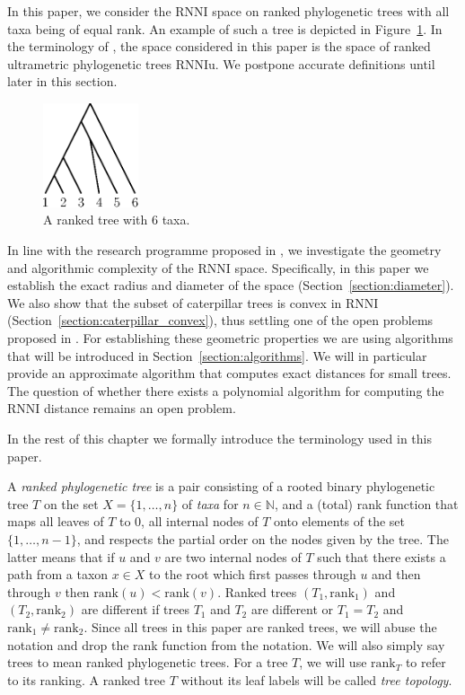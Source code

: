 \documentclass{amsart}
\newcommand{\rank}{\mathrm{rank}}
\newcommand{\rnni}{\mathrm{RNNI}}
\newcommand{\rnniu}{\mathrm{RNNIu}}
\begin{document}
In this paper, we consider the $\rnni$ space on ranked phylogenetic trees with all taxa being of equal rank.
An example of such a tree is depicted in Figure~\ref{fig:ranked_tree}.
In the terminology of \autocite{Gavryushkin2018-ol}, the space considered in this paper is the space of ranked ultrametric phylogenetic trees $\rnniu$.
We postpone accurate definitions until later in this section.

\begin{figure}[H]
\centering
\includegraphics[width=0.25\textwidth]{ranked_tree}
\vspace{12pt}
\caption{A ranked tree with $6$ taxa.}
\label{fig:ranked_tree}
\end{figure}

In line with the research programme proposed in \autocite{Gavryushkin2018-ol}, we investigate the geometry and algorithmic complexity of the $\rnni$ space.
Specifically, in this paper we establish the exact radius and diameter of the space (Section~\ref{section:diameter}).
We also show that the subset of caterpillar trees is convex in $\rnni$ (Section~\ref{section:caterpillar_convex}), thus settling one of the open problems proposed in \autocite{Gavryushkin2018-ol}.
For establishing these geometric properties we are using algorithms that will be introduced in Section~\ref{section:algorithms}.
We will in particular provide an approximate algorithm that computes exact distances for small trees.
The question of whether there exists a polynomial algorithm for computing the $\rnni$ distance remains an open problem.

In the rest of this chapter we formally introduce the terminology used in this paper.

A \emph{ranked phylogenetic tree} is a pair consisting of a rooted binary phylogenetic tree $T$ on the set $X = \{1, \ldots, n\}$ of \emph{taxa} for $n \in \mathbb N$, and a (total) rank function that maps all leaves of $T$ to $0$, all internal nodes of $T$ onto elements of the set $\{1, \ldots, n-1\}$, and respects the partial order on the nodes given by the tree.
The latter means that if $u$ and $v$ are two internal nodes of $T$ such that there exists a path from a taxon $x \in X$ to the root which first passes through $u$ and then through $v$ then $\rank(u) < \rank(v)$.
Ranked trees $(T_1, \rank_1)$ and $(T_2, \rank_2)$ are different if trees $T_1$ and $T_2$ are different or $T_1 = T_2$ and $\rank_1 \neq \rank_2$.
Since all trees in this paper are ranked trees, we will abuse the notation and drop the rank function from the notation.
We will also simply say trees to mean ranked phylogenetic trees.
For a tree $T$, we will use $\rank_T$ to refer to its ranking.
A ranked tree $T$ without its leaf labels will be called \emph{tree topology}.
\end{document}
